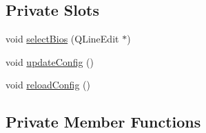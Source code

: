 \subsection*{Private Slots}
\begin{DoxyCompactItemize}
\item 
void \mbox{\hyperlink{class_q_g_b_a_1_1_settings_view_a041bcef005f9f02600d2499f9dc04820}{select\+Bios}} (Q\+Line\+Edit $\ast$)
\item 
void \mbox{\hyperlink{class_q_g_b_a_1_1_settings_view_a9290a71650ae7d397628f548b709e859}{update\+Config}} ()
\item 
void \mbox{\hyperlink{class_q_g_b_a_1_1_settings_view_a9e9647e7a375c5e48d501966fa316a15}{reload\+Config}} ()
\end{DoxyCompactItemize}
\subsection*{Private Member Functions}
